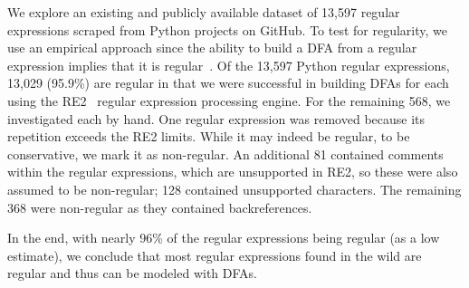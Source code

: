 %

We explore an existing and publicly available dataset of 13,597 regular expressions scraped from Python projects on GitHub. To test for regularity, we use an empirical approach since the ability to build a DFA from a regular expression implies that it is regular~\cite{sipser2006introduction}. 
Of the 13,597 Python regular expressions, 13,029 (95.9\%) are regular in that we were successful in building DFAs for each using the RE2~\cite{re2} regular expression processing engine. For the remaining 568, we investigated each by hand.  One regular expression was removed because its repetition exceeds the RE2 limits. While it may indeed be regular, to be conservative, we mark it as non-regular. An additional 81 contained comments within the regular expressions, which are unsupported in RE2, so these were also assumed to be non-regular; 128 contained unsupported characters. The remaining 368 were non-regular as they contained backreferences. 

In the end, with nearly 96\% of the regular expressions being regular (as a low estimate), we conclude that most regular expressions found in the wild are regular and thus can be modeled with DFAs. %

